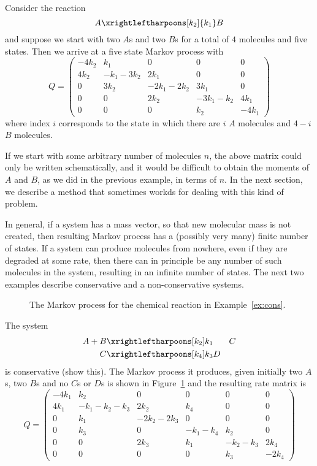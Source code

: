 \begin{example} \label{ex:ab}
Consider the reaction 
%
$$
A \xrightleftharpoons[k_2]{k_1} B
$$
and suppose we start with two $A$s and two $B$s for a total of $4$
molecules and five states. Then we arrive at a five state Markov
process with
%
$$
Q = \left ( \begin{array}{ccccc}
-4 k_2 & k_1 & 0 & 0 & 0 \\
4 k_2 & -k_1-3k_2 & 2 k_1 & 0 & 0 \\
0 & 3 k_2 & -2 k_1 -2 k_2 & 3 k_1 & 0 \\
0 & 0 & 2 k_2 & -3 k_1 - k_2 & 4 k_1 \\
0 & 0 & 0 & k_2 & -4 k_1
\end{array} \right ) 
$$
where index $i$ corresponds to the state in which there are $i$ $A$
molecules and $4-i$ $B$ molecules. 

If we start with some arbitrary number of molecules $n$, the
above matrix could only be written schematically, and it would be
difficult to obtain the moments of $A$ and $B$, as we did in the
previous example, in terms of $n$. In the next section, we describe a
method that sometimes workds for dealing with this kind of
problem. \enx
\end{example}

In general, if a system has a mass vector, so that new molecular mass
is not created, then resulting Markov process has a (possibly very
many) finite number of states. If a system can produce molecules from
nowhere, even if they are degraded at some rate, then there can in
principle be any number of such molecules in the system, resulting in
an infinite number of states. The next two examples describe
conservative and a non-conservative systems.

\begin{figure}
\centering
{}
\caption{\label{fig:cons} The Markov process for the chemical reaction in Example~\ref{ex:cons}.
}
\end{figure}

\begin{example} \label{ex:cons}
The system 
%
\begin{eqnarray*}
A + B & \rreact{k_1}{k_2}  & C  \\
C & \rreact{k_3}{k_4} D 
\end{eqnarray*}
is conservative (show this). The Markov process it produces, given
initially two $A$s, two $B$s and no $C$s or $D$s is shown in
Figure~\ref{fig:cons} and the resulting rate matrix is 
$$
Q = \left (
\begin{array}{cccccc}
-4 k_1 & k_2 & 0 & 0 & 0 & 0 \\
4k_1 & -k_1-k_2 -k_3 & 2 k_2 & k_4 & 0 & 0 \\
0 & k_1 & -2k_2-2k_3 & 0 & 0 & 0 \\
0 & k_3 & 0 & -k_1 - k_4 & k_2 & 0 \\
0 & 0 & 2 k_3 & k_1 & -k_2-k_3 & 2 k_4 \\
0 & 0 & 0 & 0 & k_3 & -2k_4 
\end{array}
\right )
$$ \enx
\end{example}



